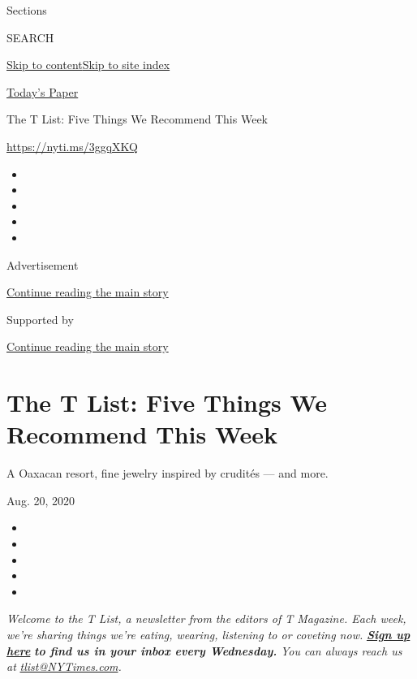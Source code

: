 Sections

SEARCH

\protect\hyperlink{site-content}{Skip to
content}\protect\hyperlink{site-index}{Skip to site index}

\href{https://myaccount.nytimes3xbfgragh.onion/auth/login?response_type=cookie\&client_id=vi}{}

\href{https://www.nytimes3xbfgragh.onion/section/todayspaper}{Today's
Paper}

The T List: Five Things We Recommend This Week

\url{https://nyti.ms/3ggqXKQ}

\begin{itemize}
\item
\item
\item
\item
\item
\end{itemize}

Advertisement

\protect\hyperlink{after-top}{Continue reading the main story}

Supported by

\protect\hyperlink{after-sponsor}{Continue reading the main story}

\hypertarget{the-t-list-five-things-we-recommend-this-week}{%
\section{The T List: Five Things We Recommend This
Week}\label{the-t-list-five-things-we-recommend-this-week}}

A Oaxacan resort, fine jewelry inspired by crudités --- and more.

Aug. 20, 2020

\begin{itemize}
\item
\item
\item
\item
\item
\end{itemize}

\emph{Welcome to the T List, a newsletter from the editors of T
Magazine. Each week, we're sharing things we're eating, wearing,
listening to or coveting now.}
\textbf{\href{https://www.nytimes3xbfgragh.onion/newsletters/t-list?module=inline}{\emph{Sign
up here}}} \emph{\textbf{to find us in your inbox every Wednesday.}}
\emph{You can always reach us at}
\href{mailto:tlist@NYTimes.com}{\emph{tlist@NYTimes.com}}\emph{.}

